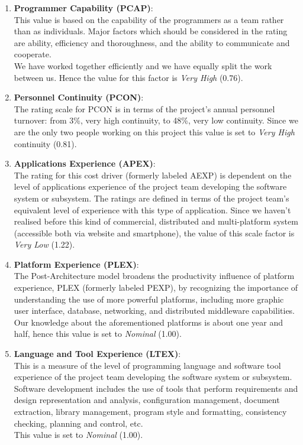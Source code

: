 \documentclass[\mainpath/main]{subfiles}
\begin{document}
\begin{enumerate}
	\item \textbf{Programmer Capability (PCAP)}:\\
	This value is based on the capability of the programmers as a team rather than as individuals. Major factors which should be considered in the rating are ability, efficiency and thoroughness, and the ability to communicate and cooperate.\\
	We have worked together efficiently and we have equally split the work between us. Hence the value for this factor is \textit{Very High} (0.76).
	
	\item \textbf{Personnel Continuity (PCON)}:\\
	The rating scale for PCON is in terms of the project's annual personnel turnover: from 3\%, very high continuity, to 48\%, very low continuity. Since we are the only two people working on this project this value is set to \textit{Very High} continuity (0.81).
	
	\item \textbf{Applications Experience (APEX)}:\\
	The rating for this cost driver (formerly labeled AEXP) is dependent on the level of	applications experience of the project team developing the software system or subsystem. The ratings are defined in terms of the project team's equivalent level of experience with this type of application. Since we haven't realised before this kind of commercial, distributed and multi-platform system (accessible both via website and smartphone), the value of this scale factor is \textit{Very Low} (1.22).
	
	\item \textbf{Platform Experience (PLEX)}:\\
	The Post-Architecture model broadens the productivity influence of platform experience, PLEX (formerly labeled PEXP), by recognizing the importance of understanding the use of more	powerful platforms, including more graphic user interface, database, networking, and distributed	middleware capabilities.\\
	Our knowledge about the aforementioned platforms is about one year and half, hence this value is set to \textit{Nominal} (1.00).
	
	\item \textbf{Language and Tool Experience (LTEX)}:\\
	This is a measure of the level of programming language and software tool experience of the project team developing the software system or subsystem. Software development includes the use of tools that perform requirements and design representation and analysis, configuration
	management, document extraction, library management, program style and formatting, consistency checking, planning and control, etc.\\
	This value is set to \textit{Nominal} (1.00).\\
	

\end{enumerate}
\end{document}
